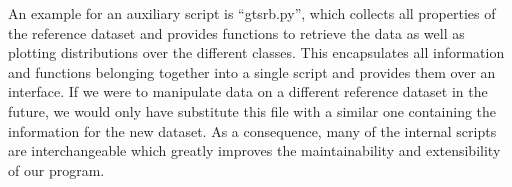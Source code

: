 An example for an auxiliary script is \enquote{gtsrb.py}, which collects all properties of the reference dataset and provides functions to retrieve the data as well as plotting distributions over the different classes.
This encapsulates all information and functions belonging together into a single script and provides them over an interface.
If we were to manipulate data on a different reference dataset in the future, we would only have substitute this file with a similar one containing the information for the new dataset.
As a consequence, many of the internal scripts are interchangeable which greatly improves the maintainability and extensibility of our program.
